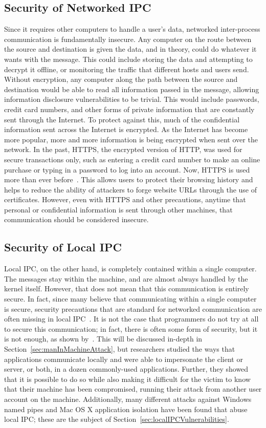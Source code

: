 \subsection{Security of Networked IPC}
\label{sec:networkedIPCSecurity}
Since it requires other computers to handle a user's data, networked inter-process communication is fundamentally insecure.  Any computer on the route between the source and destination is given the data, and in theory, could do whatever it wants with the message.  This could include storing the data and attempting to decrypt it offline, or monitoring the traffic that different hosts and users send.  Without encryption, any computer along the path between the source and destination would be able to read all information passed in the message, allowing information disclosure vulnerabilities to be trivial.  This would include passwords, credit card numbers, and other forms of private information that are constantly sent through the Internet.  To protect against this, much of the confidential information sent across the Internet is encrypted.  As the Internet has become more popular, more and more information is being encrypted when sent over the network.  In the past, HTTPS, the encrypted version of HTTP, was used for secure transactions only, such as entering a credit card number to make an online purchase or typing in a password to log into an account.  Now, HTTPS is used more than ever before~\cite{google_transparency_report}.  This allows users to protect their browsing history and helps to reduce the ability of attackers to forge website URLs through the use of certificates.  However, even with HTTPS and other precautions, anytime that personal or confidential information is sent through other machines, that communication should be considered insecure.

\subsection{Security of Local IPC}
\label{sec:localIPCSecurity}
Local IPC, on the other hand, is completely contained within a single computer.  The messages stay within the machine, and are almost always handled by the kernel itself.  However, that does not mean that this communication is entirely secure.  In fact, since many believe that communicating within a single computer is secure, security precautions that are standard for networked communication are often missing in local IPC~\cite{MitMa}.  It is not the case that programmers do not try at all to secure this communication; in fact, there is often some form of security, but it is not enough, as shown by~\cite{MitMa}.  This will be discussed in-depth in Section~\ref{sec:manInMachineAttack}, but researchers studied the ways that applications communicate locally and were able to impersonate the client or server, or both, in a dozen commonly-used applications.  Further, they showed that it is possible to do so while also making it difficult for the victim to know that their machine has been compromised, running their attack from another user account on the machine.  Additionally, many different attacks against Windows named pipes and Mac OS X application isolation have been found that abuse local IPC; these are the subject of Section~\ref{sec:localIPCVulnerabilities}.


